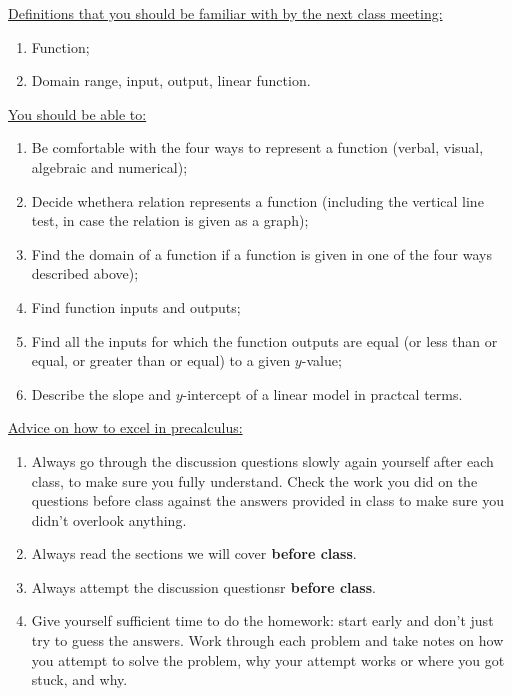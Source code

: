 \documentclass[12pt,dvipsnames]{article}
\begin{document}
 \begin{mdframed}[style=exampledefault,frametitle={Looking Ahead to Next Week...}]
 	{\underline{Definitions that you should be familiar with by the next class meeting:} }
 	\begin{enumerate}[label= {  \arabic*:},labelindent=2em, style = standard,leftmargin=4pc, labelsep=*, noitemsep]
 		\item Function;
                     \item Domain range, input, output, linear function.
 		
 	\end{enumerate}
 	{\underline{You should be able to:} }
 	\begin{enumerate}[label= {  \arabic*:},labelindent=2em, style = standard,leftmargin=4pc, labelsep=*, noitemsep]
 		\item Be comfortable with the four ways to represent a function (verbal, visual, algebraic and numerical);
 		\item Decide whethera relation represents a function (including the vertical line test, in case the relation is given as a graph);
 		\item Find the domain of a function if a function is given in one of the four ways described above);
                      \item Find function inputs and outputs;
                     \item Find all the inputs for which the function outputs are equal (or less than or equal, or greater than or equal) to a given $y$-value;
                   \item Describe the slope and $y$-intercept of a linear model in practcal terms.
 	\end{enumerate}
{\underline{Advice on how to excel in precalculus:} }
\begin{enumerate}[label= {  \arabic*:},labelindent=2em, style = standard,leftmargin=4pc, labelsep=*, noitemsep]
 		\item  Always go through the discussion questions slowly again yourself after each class, to make sure you fully understand.
Check the  work you did on the questions before class against the answers provided in class to make sure you didn’t overlook anything.
\item Always read the sections we will cover{\bf{ before class}}.
\item Always attempt the discussion questionsr{\bf{ before class}}.
\item Give yourself sufficient time to do the homework: start early and don't just try to guess the answers. Work through each problem and take notes on how you attempt to solve the problem, why your attempt works or where you got stuck, and why.
\end{enumerate}
 	\end{mdframed}
\end{document}
